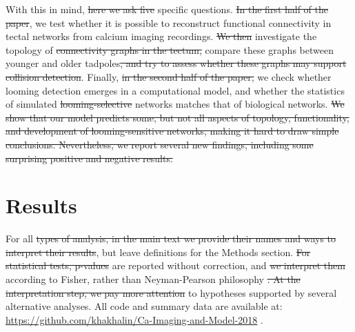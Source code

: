 \documentclass{article}
\providecommand{\DIFaddtex}[1]{{\protect\color{blue}{#1}}} %
\providecommand{\DIFdeltex}[1]{{\protect\color{red}\sout{#1}}}                      %
\providecommand{\DIFaddbegin}{} %
\providecommand{\DIFaddend}{} %
\providecommand{\DIFdelbegin}{} %
\providecommand{\DIFdelend}{} %
\providecommand{\DIFadd}[1]{\texorpdfstring{\DIFaddtex{#1}}{#1}} %
\providecommand{\DIFdel}[1]{\texorpdfstring{\DIFdeltex{#1}}{}} %
\newcommand{\DIFscaledelfig}{0.5}
\newlength{\DIFdelgraphicswidth} %
\newlength{\DIFdelgraphicsheight} %
\newcommand{\DIFaddincludegraphics}[2][]{{\color{blue}\fbox{\DIFOincludegraphics[#1]{#2}}}} %
\newcommand{\DIFdelincludegraphics}[2][]{%
\sbox{\DIFdelgraphicsbox}{\DIFOincludegraphics[#1]{#2}}%
\settoboxwidth{\DIFdelgraphicswidth}{\DIFdelgraphicsbox} %
\settoboxtotalheight{\DIFdelgraphicsheight}{\DIFdelgraphicsbox} %
\scalebox{\DIFscaledelfig}{%
\parbox[b]{\DIFdelgraphicswidth}{\usebox{\DIFdelgraphicsbox}\\[-\baselineskip] \rule{\DIFdelgraphicswidth}{0em}}\llap{\resizebox{\DIFdelgraphicswidth}{\DIFdelgraphicsheight}{%
\setlength{\unitlength}{\DIFdelgraphicswidth}%
\begin{picture}(1,1)%
\thicklines\linethickness{2pt} %
{\color[rgb]{1,0,0}\put(0,0){\framebox(1,1){}}}%
{\color[rgb]{1,0,0}\put(0,0){\line( 1,1){1}}}%
{\color[rgb]{1,0,0}\put(0,1){\line(1,-1){1}}}%
\end{picture}%
}\hspace*{3pt}}} %
} %
\DeclareRobustCommand{\DIFaddbegin}{\DIFOaddbegin \let\includegraphics\DIFaddincludegraphics} %
\DeclareRobustCommand{\DIFaddend}{\DIFOaddend \let\includegraphics\DIFOincludegraphics} %
\DeclareRobustCommand{\DIFdelbegin}{\DIFOdelbegin \let\includegraphics\DIFdelincludegraphics} %
\DeclareRobustCommand{\DIFdelend}{\DIFOaddend \let\includegraphics\DIFOincludegraphics} %
\begin{document}
With this in mind, \DIFdelbegin \DIFdel{here we ask five }\DIFdelend \DIFaddbegin \DIFadd{we ask three }\DIFaddend specific questions. \DIFdelbegin \DIFdel{In the first half of the paper}\DIFdelend \DIFaddbegin \DIFadd{First}\DIFaddend , we test whether it is possible to reconstruct functional connectivity in tectal networks from calcium imaging recordings. \DIFdelbegin \DIFdel{We then }\DIFdelend \DIFaddbegin \DIFadd{Then we }\DIFaddend investigate the topology of \DIFdelbegin \DIFdel{connectivity graphs in the tectum, }\DIFdelend \DIFaddbegin \DIFadd{reconstructed connectivity graphs, and }\DIFaddend compare these graphs between younger and older tadpoles\DIFdelbegin \DIFdel{, and try to assess whether these graphs may support collision detection}\DIFdelend . Finally, \DIFdelbegin \DIFdel{in the second half of the paper, }\DIFdelend we check whether looming detection emerges in a computational model, and whether the statistics of simulated \DIFdelbegin \DIFdel{looming-selective }\DIFdelend networks matches that of biological networks.
\DIFdelbegin \DIFdel{We show that our model predicts some, but not all aspects of topology, functionality, and development of looming-sensitive networks, making it hard to draw simple conclusions. Nevertheless, we report several new findings, including some surprising positive and negative results.
}\DIFdelend 

\section*{Results}

For all \DIFdelbegin \DIFdel{types of analysis, in the main text we provide their names and ways to interpret their results}\DIFdelend \DIFaddbegin \DIFadd{analyses, we name and interpret them in the text}\DIFaddend , but leave \DIFaddbegin \DIFadd{precise }\DIFaddend definitions for the Methods section. \DIFdelbegin \DIFdel{For statistical tests, p-values }\DIFdelend \DIFaddbegin \DIFadd{P-values }\DIFaddend are reported without correction, and \DIFdelbegin \DIFdel{we interpret them }\DIFdelend \DIFaddbegin \DIFadd{are interpreted }\DIFaddend according to Fisher, rather than Neyman-Pearson philosophy \citep{greenland2016, amrhein2019pval}\DIFdelbegin \DIFdel{. At the interpretation step, we pay more attention }\DIFdelend \DIFaddbegin \DIFadd{, with more attention payed }\DIFaddend to hypotheses supported by several alternative analyses. All code and summary data are available at:  \url{https://github.com/khakhalin/Ca-Imaging-and-Model-2018} .
\end{document}
